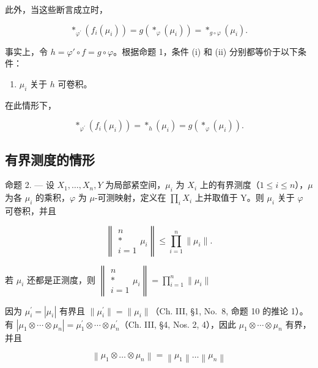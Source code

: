 此外，当这些断言成立时，

\[
\left. \ast_ {\varphi^ {\prime}} \left(f _ {i} \left(\mu_ {i}\right)\right) = g \left(\ast_ {\varphi} \left(\mu_ {i}\right)\right) = \ast_ {g \circ \varphi} \left(\mu_ {i}\right). \right.\tag{4}
\]

事实上，令 \(h = \varphi' \circ f = g \circ \varphi\)。根据命题 1，条件 (i) 和 (ii) 分别都等价于以下条件：

\begin{enumerate}
\def\labelenumi{(\roman{enumi})}
\setcounter{enumi}{2}
\tightlist
\item
  \(\mu_{i}\) 关于 \(h\) 可卷积。
\end{enumerate}

在此情形下，

\[
\left. \ast_ {\varphi^ {\prime}} \left(f _ {i} \left(\mu_ {i}\right)\right) = \ast_ {h} \left(\mu_ {i}\right) = g \left(\ast_ {\varphi} \left(\mu_ {i}\right)\right). \right.
\]

\subsection{有界测度的情形}

命题 2. --- 设 \(X_{1},\ldots,X_{n},Y\) 为局部紧空间，\(\mu_{i}\) 为 \(X_{i}\) 上的有界测度（\(1\leqslant i\leqslant n\)），\(\mu\) 为各 \(\mu_{i}\) 的乘积，\(\varphi\) 为 \(\mu\)-可测映射，定义在 \(\prod_{i}X_{i}\) 上并取值于 Y。则 \(\mu_{i}\) 关于 \(\varphi\) 可卷积，并且

\[
\left\| \begin{array}{c} n \\ * \\ i = 1 \end{array} \mu_ {i} \right\| \leqslant \prod_ {i = 1} ^ {n} \| \mu_ {i} \|.
\]

若 \(\mu_{i}\) 还都是正测度，则 \(\left\| \begin{array}{c}n\\ *\\ i = 1 \end{array} \mu_i\right\| = \prod_{i = 1}^{n}\| \mu_{i}\|\)

因为 \(\mu_{i}^{\prime}=|\mu_{i}|\) 有界且 \(\|\mu_{i}^{\prime}\|=\|\mu_{i}\|\)（Ch. III, §1, No.~8, 命题 10 的推论 1）。有 \(|\mu_{1}\otimes\cdots\otimes\mu_{n}|=\mu_{1}^{\prime}\otimes\cdots\otimes\mu_{n}^{\prime}\)（Ch. III, §4, Nos. 2, 4），因此 \(\mu_{1}\otimes\cdots\otimes\mu_{n}\) 有界，并且

\[
\left\| \mu_ {1} \otimes \dots \otimes \mu_ {n} \right\| = \left\| \mu_ {1} \right\| \dots \left\| \mu_ {n} \right\|
\]

